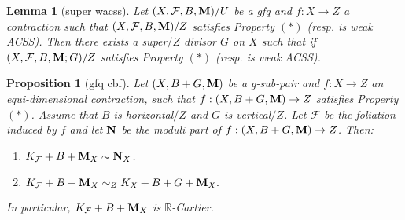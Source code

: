 \documentclass[11pt]{amsart}
\numberwithin{equation}{section}
\newcommand{\Mm}{{\bf{M}}}
\newcommand{\Nn}{{\bf{N}}}
\newcommand{\Rr}{\mathbb{R}}
\newcommand{\Ff}{\mathcal{F}}
\newtheorem{lem}[thm]{Lemma}
\newtheorem{prop}[thm]{Proposition}
\theoremstyle{definition}
\theoremstyle{definition}
\theoremstyle{definition}
\begin{document}
\begin{lem}[super wacss]\label{lem: weak acss can be super}
    Let $(X,\Ff,B,\Mm)/U$ be a gfq and $f: X\rightarrow Z$ a contraction such that $(X,\Ff,B,\Mm)/Z$ satisfies Property $(*)$ (resp. is weak ACSS). Then there exists a super$/Z$ divisor $G$ on $X$ such that if $(X,\Ff,B,\Mm;G)/Z$ satisfies Property $(*)$ (resp. is weak ACSS).
\end{lem}

\begin{prop}[gfq cbf]\label{prop: weak cbf gfq}
Let $(X,B+G,\Mm)$ be a g-sub-pair and $f: X\rightarrow Z$ an equi-dimensional contraction, such that $f: (X,B+G,\Mm)\rightarrow Z$ satisfies Property $(*)$. Assume that $B$ is horizontal$/Z$ and $G$ is vertical$/Z$. Let $\Ff$ be the foliation induced by $f$ and let $\Nn$ be the moduli part of $f: (X,B+G,\Mm)\rightarrow Z$. Then:
\begin{enumerate}
  \item $K_{\Ff}+B+\Mm_X\sim \Nn_X$.
  \item $K_{\Ff}+B+\Mm_X\sim_{Z}K_X+B+G+\Mm_X.$
\end{enumerate}
In particular, $K_{\Ff}+B+\Mm_X$ is $\Rr$-Cartier.
\end{prop}
\end{document}
